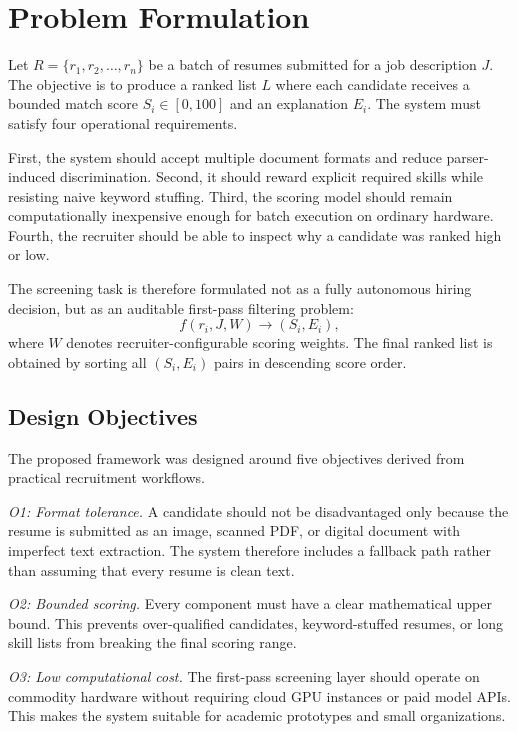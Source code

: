 \documentclass[conference]{IEEEtran}
\begin{document}
\section{Problem Formulation}
Let \(R=\{r_1,r_2,\ldots,r_n\}\) be a batch of resumes submitted for a job description \(J\). The objective is to produce a ranked list \(L\) where each candidate receives a bounded match score \(S_i \in [0,100]\) and an explanation \(E_i\). The system must satisfy four operational requirements.

First, the system should accept multiple document formats and reduce parser-induced discrimination. Second, it should reward explicit required skills while resisting naive keyword stuffing. Third, the scoring model should remain computationally inexpensive enough for batch execution on ordinary hardware. Fourth, the recruiter should be able to inspect why a candidate was ranked high or low.

The screening task is therefore formulated not as a fully autonomous hiring decision, but as an auditable first-pass filtering problem:
\begin{equation}
f(r_i,J,W) \rightarrow (S_i,E_i),
\end{equation}
where \(W\) denotes recruiter-configurable scoring weights. The final ranked list is obtained by sorting all \((S_i,E_i)\) pairs in descending score order.

\subsection{Design Objectives}
The proposed framework was designed around five objectives derived from practical recruitment workflows.

\textit{O1: Format tolerance.} A candidate should not be disadvantaged only because the resume is submitted as an image, scanned PDF, or digital document with imperfect text extraction. The system therefore includes a fallback path rather than assuming that every resume is clean text.

\textit{O2: Bounded scoring.} Every component must have a clear mathematical upper bound. This prevents over-qualified candidates, keyword-stuffed resumes, or long skill lists from breaking the final scoring range.

\textit{O3: Low computational cost.} The first-pass screening layer should operate on commodity hardware without requiring cloud GPU instances or paid model APIs. This makes the system suitable for academic prototypes and small organizations.
\end{document}
